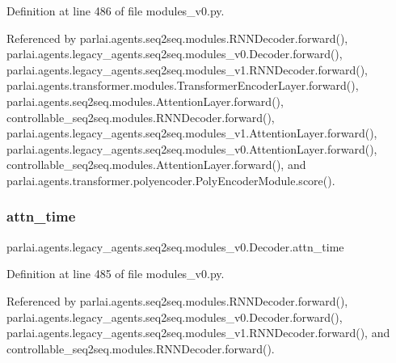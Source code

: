 Definition at line 486 of file modules\+\_\+v0.\+py.



Referenced by parlai.\+agents.\+seq2seq.\+modules.\+R\+N\+N\+Decoder.\+forward(), parlai.\+agents.\+legacy\+\_\+agents.\+seq2seq.\+modules\+\_\+v0.\+Decoder.\+forward(), parlai.\+agents.\+legacy\+\_\+agents.\+seq2seq.\+modules\+\_\+v1.\+R\+N\+N\+Decoder.\+forward(), parlai.\+agents.\+transformer.\+modules.\+Transformer\+Encoder\+Layer.\+forward(), parlai.\+agents.\+seq2seq.\+modules.\+Attention\+Layer.\+forward(), controllable\+\_\+seq2seq.\+modules.\+R\+N\+N\+Decoder.\+forward(), parlai.\+agents.\+legacy\+\_\+agents.\+seq2seq.\+modules\+\_\+v1.\+Attention\+Layer.\+forward(), parlai.\+agents.\+legacy\+\_\+agents.\+seq2seq.\+modules\+\_\+v0.\+Attention\+Layer.\+forward(), controllable\+\_\+seq2seq.\+modules.\+Attention\+Layer.\+forward(), and parlai.\+agents.\+transformer.\+polyencoder.\+Poly\+Encoder\+Module.\+score().

\mbox{\label{classparlai_1_1agents_1_1legacy__agents_1_1seq2seq_1_1modules__v0_1_1Decoder_acbb937e041f6f172d15d1eda413c7aca}} 
\subsubsection{\texorpdfstring{attn\+\_\+time}{attn\_time}}
{\footnotesize\ttfamily parlai.\+agents.\+legacy\+\_\+agents.\+seq2seq.\+modules\+\_\+v0.\+Decoder.\+attn\+\_\+time}



Definition at line 485 of file modules\+\_\+v0.\+py.



Referenced by parlai.\+agents.\+seq2seq.\+modules.\+R\+N\+N\+Decoder.\+forward(), parlai.\+agents.\+legacy\+\_\+agents.\+seq2seq.\+modules\+\_\+v0.\+Decoder.\+forward(), parlai.\+agents.\+legacy\+\_\+agents.\+seq2seq.\+modules\+\_\+v1.\+R\+N\+N\+Decoder.\+forward(), and controllable\+\_\+seq2seq.\+modules.\+R\+N\+N\+Decoder.\+forward().

